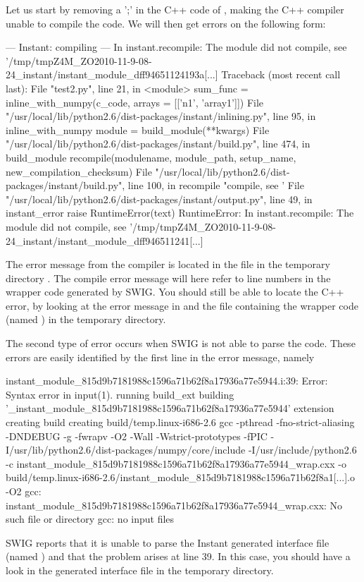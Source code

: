 Let us start by removing a ';' in the C++ code of
, making the C++ compiler unable to compile the code. We will then get errors on the
following form:
\begin{progoutput}
--- Instant: compiling ---
In instant.recompile: The module did not compile,
   see '/tmp/tmpZ4M_ZO2010-11-9-08-24_instant/instant_module_dff94651124193a[...]
Traceback (most recent call last):
      File "test2.py", line 21, in <module>
          sum_func = inline_with_numpy(c_code, arrays = [['n1', 'array1']])
        File "/usr/local/lib/python2.6/dist-packages/instant/inlining.py", line 95, in inline_with_numpy
          module = build_module(**kwargs)
        File "/usr/local/lib/python2.6/dist-packages/instant/build.py", line 474, in build_module
          recompile(modulename, module_path, setup_name, new_compilation_checksum)
        File "/usr/local/lib/python2.6/dist-packages/instant/build.py", line 100, in recompile
          "compile, see '%
        File "/usr/local/lib/python2.6/dist-packages/instant/output.py", line 49, in instant_error
          raise RuntimeError(text)
      RuntimeError: In instant.recompile: The module did not compile,
      see '/tmp/tmpZ4M_ZO2010-11-9-08-24_instant/instant_module_dff946511241[...]
\end{progoutput}
The error message from the compiler is located in the file  in the temporary directory
.
The compile error message will here refer to line numbers in the
wrapper code generated by SWIG.  You should still be able to locate
the C++ error, by looking at the error message in 
and the file containing the wrapper code (named ) in
the temporary directory.

The second type of error occurs when SWIG is not able to parse the
code. These errors are easily identified by the first line in the
error message, namely
\begin{progoutput}
instant_module_815d9b7181988c1596a71b62f8a17936a77e5944.i:39: Error: Syntax error in input(1).
running build_ext
building '_instant_module_815d9b7181988c1596a71b62f8a17936a77e5944' extension
creating build
creating build/temp.linux-i686-2.6
gcc -pthread -fno-strict-aliasing -DNDEBUG -g -fwrapv -O2 -Wall -Wstrict-prototypes -fPIC
   -I/usr/lib/python2.6/dist-packages/numpy/core/include -I/usr/include/python2.6
   -c instant_module_815d9b7181988c1596a71b62f8a17936a77e5944_wrap.cxx
   -o build/temp.linux-i686-2.6/instant_module_815d9b7181988c1596a71b62f8a1[...].o -O2
gcc: instant_module_815d9b7181988c1596a71b62f8a17936a77e5944_wrap.cxx: No such file or directory
gcc: no input files
\end{progoutput}
SWIG reports that it is unable to parse the Instant generated
interface file (named ) and that the problem arises at line
39.  In this case, you should have a look in the generated interface
file in the temporary directory.

